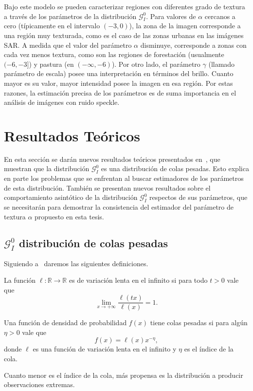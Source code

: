 Bajo este modelo se pueden caracterizar regiones con diferentes grado de textura a través de los parámetros de la distribución $\mathcal{G}_I^{0}$. Para valores de $\alpha$ cercanos a cero (típicamente en el intervalo $(-3,0)$), la zona de la imagen corresponde a una región muy texturada, como es el caso de las zonas urbanas en las imágenes SAR. A medida que el valor del parámetro $\alpha$ disminuye, corresponde a zonas con cada vez menos textura, como son las regiones de forestación (usualmente $(-6,-3]$) y pastura (en $(-\infty,-6)$). Por otro lado, el parámetro $\gamma$ (llamado parámetro de escala) posee una interpretación en términos del brillo. Cuanto mayor es su valor, mayor intensidad posee la imagen en esa región. Por estas razones, la estimación precisa de los parámetros es de suma importancia en el análisis de imágenes con ruido speckle. 



\section{Resultados Teóricos}
\label{ResultadosTeoricosGI0}

En esta sección se darán nuevos resultados teóricos presentados en~\citet{gambini2015}, que muestran que la distribución $\mathcal{G}_I^0$ es una distribución de colas pesadas. Esto explica en parte los problemas que se enfrentan al buscar estimadores de los parámetros de esta distribución.  También se presentan nuevos resultados sobre el comportamiento asintótico de la distribución $\mathcal{G}_I^0$ respectos de sus parámetros, que se necesitarán para demostrar la consistencia del estimador del parámetro de textura $\alpha$ propuesto en esta tesis.

\subsection{$\mathcal{G}_I^0$ distribución de colas pesadas}
\label{colas}
Siguiendo a~\citet{Gre,Jorgensen,Rojo} daremos las siguientes definiciones.

\begin{definition} \label{Def:lenta}
	La función $\ell\colon\mathbb R \to\mathbb R$ es de variación lenta en el infinito si para todo $t>0$ vale que
	$$
	\lim_{x\to+\infty}\dfrac{\ell (tx)}{\ell(x)}=1.
	$$
\end{definition}

\begin{definition} 
	Una función de densidad de probabilidad $f(x)$ tiene colas pesadas si para algún $\eta >0$ vale que
	$$
	f(x)=\ell(x)  x^{-\eta},
	$$
	donde $\ell$ es una función de variación lenta en el infinito y $\eta$ es el índice de la cola.
\end{definition}
Cuanto menor es el índice de la cola, más propensa es la distribución a producir observaciones extremas.

